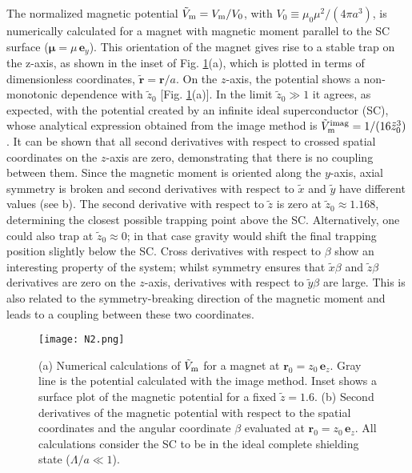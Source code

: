 \documentclass[twocolumn,superscriptaddress,floatfix,preprintnumbers,prl]{revtex4}
\begin{document}
The normalized magnetic potential $\tilde{V}_{\rm m}=V_{\rm m}/V_0$, with $V_0\equiv\mu_0 \mu^2/(4\pi a^3)$, is numerically calculated for a magnet with magnetic moment parallel to the SC surface ($\boldsymbol{\mu}=\mu \,\mathbf{e}_y$). This orientation of the magnet gives rise to a stable trap on the z-axis, as shown in the inset of Fig. \ref{fig.S1}(a), which is plotted in terms of dimensionless coordinates, $\tilde{\mathbf{r}} = \mathbf{r}/a$. %
On the $z$-axis, the potential shows a non-monotonic dependence with $\tilde{z}_0$ [Fig. \ref{fig.S1}(a)]. In the limit $\tilde{z}_0\gg 1$ it agrees, as expected, with the potential created by an infinite ideal superconductor (SC), whose analytical expression obtained from the image method is $\tilde{V}_{\rm m}^{\rm imag}=1/(16\tilde{z}_0^3)$. It can be shown that all second derivatives with respect to crossed spatial coordinates on the $z$-axis are zero, demonstrating that there is no coupling between them. %
Since the magnetic moment is oriented along the $y$-axis, axial symmetry is broken and second derivatives with respect to $\tilde{x}$ and $\tilde{y}$ have different values (see b). The second derivative with respect to $\tilde{z}$ is zero at $\tilde{z}_0 \approx 1.168$, determining the closest possible trapping point above the SC. Alternatively, one could also trap at $\tilde{z}_0 \approx 0$; in that case gravity would shift the final trapping position slightly below the SC. 
Cross derivatives with respect to $\beta$ show an interesting property of the system; whilst symmetry ensures that $\tilde{x}\beta$ and $\tilde{z}\beta$ derivatives are zero on the $z$-axis, derivatives with respect to $\tilde{y}\beta$ are large. This is also related to the symmetry-breaking direction of the magnetic moment and leads to a coupling between these two coordinates.

\begin{figure}[t]
\begin{center}
\texttt{[image: N2.png]}
\caption{ (a) Numerical calculations of $\tilde{V}_{\rm m}$ for a magnet at $\mathbf{r}_0=z_0 \,\mathbf{e}_z$. Gray line is the potential calculated with the image method. Inset shows a surface plot of the magnetic potential for a fixed $\tilde{z}=1.6$.
(b) Second derivatives of the magnetic potential with respect to the spatial coordinates and the angular coordinate $\beta$ evaluated at $\mathbf{r}_0=z_0 \,\mathbf{e}_z$. All calculations consider the SC to be in the ideal complete shielding state ($\Lambda/a\ll1$).}
\label{fig.S1}
\end{center}
\end{figure}
\end{document}
